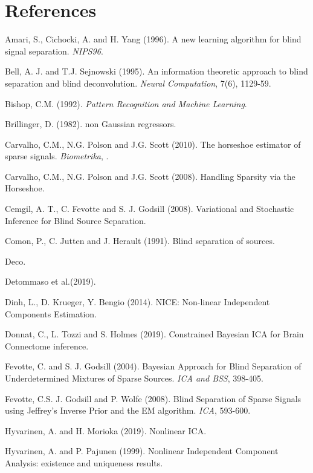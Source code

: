 \section{References}
 
 \noindent Amari, S., Cichocki, A. and H. Yang (1996). A new learning algorithm for blind signal separation. \emph{NIPS96}. \medskip 
 
 \noindent Bell, A. J.  and  T.J. Sejnowski (1995). An information theoretic approach to blind separation and blind deconvolution. \emph{Neural Computation}, 7(6), 1129-59.\medskip
 
 \noindent Bishop, C.M. (1992). \emph{Pattern Recognition and Machine Learning}. \medskip
 
 \noindent Brillinger, D. (1982).  non Gaussian regressors. \medskip 
 
\noindent  Carvalho, C.M., N.G. Polson and J.G. Scott (2010).  The horseshoe estimator of sparse signals. \emph{Biometrika}, .  \medskip

\noindent  Carvalho, C.M., N.G. Polson and J.G. Scott (2008). Handling Sparsity via the Horseshoe.\medskip

\noindent Cemgil, A. T., C. Fevotte and S. J. Godsill (2008). Variational  and Stochastic Inference for Blind Source Separation.\medskip 

\noindent Comon, P., C. Jutten and J. Herault (1991). Blind separation of sources.   \medskip 
 
 \noindent Deco. \medskip
 
 \noindent Detommaso et al.(2019). \medskip
 
\noindent Dinh, L., D. Krueger, Y. Bengio (2014).  NICE: Non-linear Independent Components Estimation. \medskip 

\noindent Donnat, C.,  L. Tozzi and  S. Holmes (2019). Constrained Bayesian ICA for Brain Connectome inference.\medskip

\noindent Fevotte, C. and S. J. Godsill  (2004). Bayesian Approach for Blind Separation of Underdetermined Mixtures of Sparse Sources.
\emph{ICA and BSS}, 398-405.\medskip


\noindent Fevotte, C.S. J. Godsill  and P. Wolfe (2008).  Blind Separation of Sparse Signals using Jeffrey's Inverse Prior and the EM algorithm. 
\emph{ICA}, 593-600.\medskip 

\noindent Hyvarinen, A. and H. Morioka (2019). Nonlinear ICA. \medskip

\noindent Hyvarinen, A. and P. Pajunen (1999). Nonlinear Independent Component Analysis: existence and uniqueness results. \medskip

